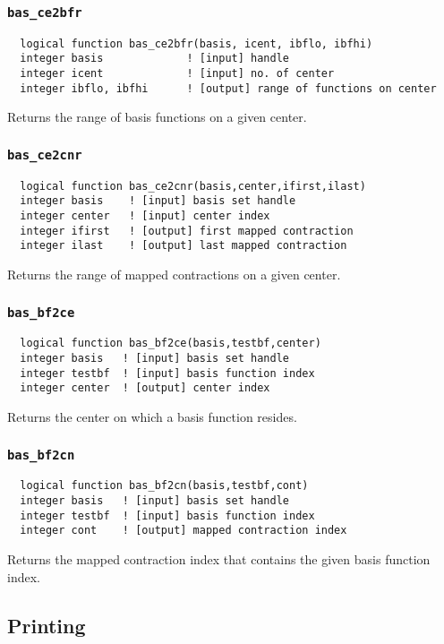 \subsubsection{{\tt bas\_ce2bfr}}
\begin{verbatim}
  logical function bas_ce2bfr(basis, icent, ibflo, ibfhi)
  integer basis             ! [input] handle
  integer icent             ! [input] no. of center
  integer ibflo, ibfhi      ! [output] range of functions on center
\end{verbatim}
Returns the range of basis functions on a given center.

\subsubsection{{\tt bas\_ce2cnr}}
\begin{verbatim}
  logical function bas_ce2cnr(basis,center,ifirst,ilast)
  integer basis    ! [input] basis set handle         
  integer center   ! [input] center index 
  integer ifirst   ! [output] first mapped contraction
  integer ilast    ! [output] last mapped contraction
\end{verbatim}
Returns the range of mapped contractions on a given center.

\subsubsection{{\tt bas\_bf2ce}}
\begin{verbatim}
  logical function bas_bf2ce(basis,testbf,center)
  integer basis   ! [input] basis set handle         
  integer testbf  ! [input] basis function index
  integer center  ! [output] center index
\end{verbatim}
Returns the center on which a basis function resides.

\subsubsection{{\tt bas\_bf2cn}}
\begin{verbatim}
  logical function bas_bf2cn(basis,testbf,cont)
  integer basis   ! [input] basis set handle         
  integer testbf  ! [input] basis function index
  integer cont    ! [output] mapped contraction index
\end{verbatim}
Returns the mapped contraction index that contains the given basis
function index.

\subsection{Printing}

